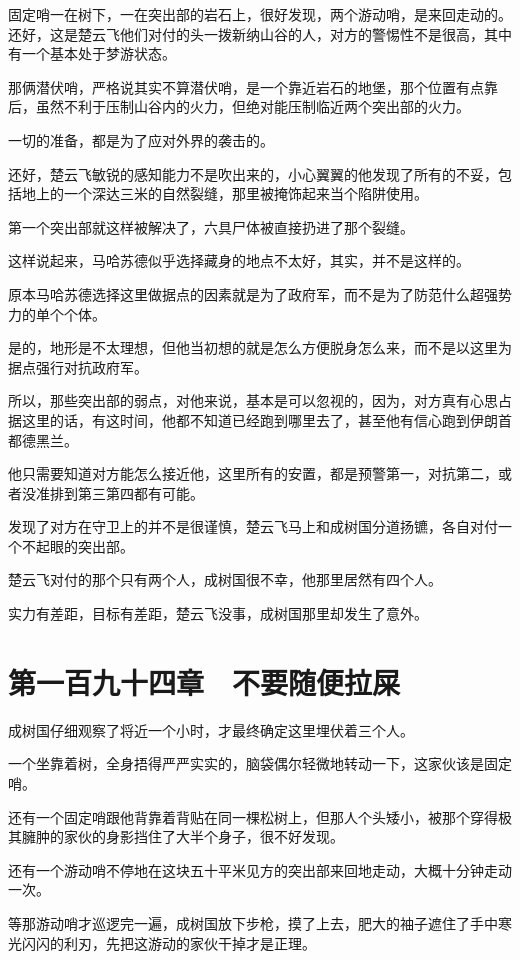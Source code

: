 固定哨一在树下，一在突出部的岩石上，很好发现，两个游动哨，是来回走动的。还好，这是楚云飞他们对付的头一拨新纳山谷的人，对方的警惕性不是很高，其中有一个基本处于梦游状态。

那俩潜伏哨，严格说其实不算潜伏哨，是一个靠近岩石的地堡，那个位置有点靠后，虽然不利于压制山谷内的火力，但绝对能压制临近两个突出部的火力。

一切的准备，都是为了应对外界的袭击的。

还好，楚云飞敏锐的感知能力不是吹出来的，小心翼翼的他发现了所有的不妥，包括地上的一个深达三米的自然裂缝，那里被掩饰起来当个陷阱使用。

第一个突出部就这样被解决了，六具尸体被直接扔进了那个裂缝。

这样说起来，马哈苏德似乎选择藏身的地点不太好，其实，并不是这样的。

原本马哈苏德选择这里做据点的因素就是为了政府军，而不是为了防范什么超强势力的单个个体。

是的，地形是不太理想，但他当初想的就是怎么方便脱身怎么来，而不是以这里为据点强行对抗政府军。

所以，那些突出部的弱点，对他来说，基本是可以忽视的，因为，对方真有心思占据这里的话，有这时间，他都不知道已经跑到哪里去了，甚至他有信心跑到伊朗首都德黑兰。

他只需要知道对方能怎么接近他，这里所有的安置，都是预警第一，对抗第二，或者没准排到第三第四都有可能。

发现了对方在守卫上的并不是很谨慎，楚云飞马上和成树国分道扬镳，各自对付一个不起眼的突出部。

楚云飞对付的那个只有两个人，成树国很不幸，他那里居然有四个人。

实力有差距，目标有差距，楚云飞没事，成树国那里却发生了意外。

\section{第一百九十四章　不要随便拉屎}

成树国仔细观察了将近一个小时，才最终确定这里埋伏着三个人。

一个坐靠着树，全身捂得严严实实的，脑袋偶尔轻微地转动一下，这家伙该是固定哨。

还有一个固定哨跟他背靠着背贴在同一棵松树上，但那人个头矮小，被那个穿得极其臃肿的家伙的身影挡住了大半个身子，很不好发现。

还有一个游动哨不停地在这块五十平米见方的突出部来回地走动，大概十分钟走动一次。

等那游动哨才巡逻完一遍，成树国放下步枪，摸了上去，肥大的袖子遮住了手中寒光闪闪的利刃，先把这游动的家伙干掉才是正理。

